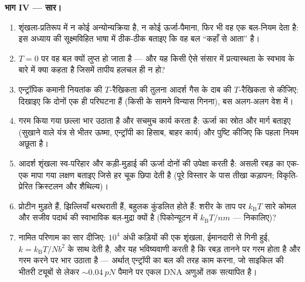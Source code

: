 \begin{problem}
\medskip\noindent\textbf{भाग IV --- सार।}
\begin{enumerate}[resume]
  \item शृंखला-प्रतिरूप में न कोई अन्योन्यक्रिया है, न कोई
        ऊर्जा-पैमाना, फिर भी वह एक बल-नियम देता है: इस अध्याय की
        सूक्ष्मविहित भाषा में ठीक-ठीक बताइए कि वह बल ``कहाँ से
        आता'' है।
  \item $T = 0$ पर वह बल क्यों लुप्त हो जाता है --- और यह किसी ऐसे
        संसार में प्रत्यास्थता के स्वभाव के बारे में क्या कहता है
        जिसमें तापीय हलचल ही न हो?
  \item एन्ट्रॉपिक कमानी नियतांक की $T$-रैखिकता की तुलना आदर्श गैस
        के दाब की $T$-रैखिकता से कीजिए: दिखाइए कि दोनों एक ही
        परिघटना हैं (किसी  के सामने विन्यास गिनना), बस
        अलग-अलग वेश में।
  \item गरम किया गया छल्ला भार उठाता है और सचमुच कार्य करता है:
        ऊर्जा का स्रोत और मार्ग बताइए (सुखाने वाले यंत्र से भीतर
        ऊष्मा, एन्ट्रॉपी का हिसाब, बाहर कार्य) और पुष्टि कीजिए कि
        पहला नियम अछूता है।
  \item आदर्श शृंखला स्व-परिहार और कड़ी-मुड़ाई की ऊर्जा दोनों की
        उपेक्षा करती है: असली रबड़ का एक-एक मापा गया लक्षण बताइए
        जिसे हर चूक छिपा देती है (पूरे विस्तार के पास तीखा कड़ापन;
        विकृति-प्रेरित क्रिस्टलन और शैथिल्य)।
  \item प्रोटीन मुड़ते हैं, झिल्लियाँ थरथराती हैं, बहुलक कुंडलित
        होते हैं: शरीर के ताप पर $k_{\text{B}}T$ सारे कोमल और सजीव
        पदार्थ की स्वाभाविक बल-मुद्रा क्यों है
        (पिकोन्यूटन में $k_{\text{B}}T/\unit{nm}$ --- निकालिए)?
  \item नामित परिणाम का सार दीजिए: $10^4$ अंधी कड़ियों की एक
        शृंखला, ईमानदारी से गिनी हुई,  $k =
        k_{\text{B}}T/Nb^2$ के साथ देती है, और यह भविष्यवाणी करती
        है कि रबड़ तानने पर गरम होता है और गरम करने पर भार उठाता है
        --- अर्थात् एन्ट्रॉपी का बल की तरह काम करना, जो साइकिल की
        भीतरी ट्यूबों से लेकर $\sim\qty{0.04}{pN}$ पैमाने पर एकल
        DNA अणुओं तक सत्यापित है।
\end{enumerate}
\end{problem}
